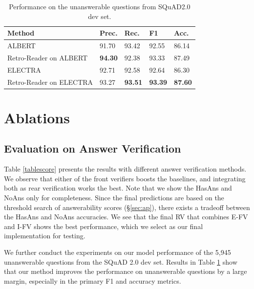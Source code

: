 \documentclass[letterpaper]{article} %
\begin{document}
\begin{table}
	\begin{center}
		\setlength{\tabcolsep}{3.5pt}
		{
			\begin{tabular}{lllll}
				\toprule
				\textbf{Method}	& \textbf{Prec.} & \textbf{Rec.} 	& \textbf{F1} & \textbf{Acc.} \\
				\midrule
				ALBERT & 91.70 & 93.42 & 92.55 & 86.14  \\
				Retro-Reader on ALBERT & \textbf{94.30} & 92.38 & 93.33 & 87.49 \\
                ELECTRA & 92.71 & 92.58 & 92.64 & 86.30 \\
                Retro-Reader on ELECTRA & 93.27 & \textbf{93.51} & \textbf{93.39} & \textbf{87.60} \\
				\bottomrule
			\end{tabular}
		}
	\end{center}
	\caption{\label{tab:unans} Performance on the unanswerable questions from SQuAD2.0 dev set.}
\end{table}

\section{Ablations}

\subsection{Evaluation on Answer Verification}
Table \ref{tablescore} presents the results with different answer verification methods. We observe that either of the front verifiers boosts the baselines, and integrating both as rear verification works the best. Note that we show the HasAns and NoAns only for completeness. Since the final predictions are based on the threshold search of answerability scores (\S\ref{sec:ap}), there exists a tradeoff between the HasAns and NoAns accuracies. We see that the final RV that combines E-FV and I-FV shows the best performance, which we select as our final implementation for testing.


We further conduct the experiments on our model performance of the 5,945 unanswerable questions from the SQuAD 2.0 dev set. Results in Table \ref{tab:unans} show that our method improves the performance on unanswerable questions by a large margin, especially in the primary F1 and accuracy metrics.
\end{document}
